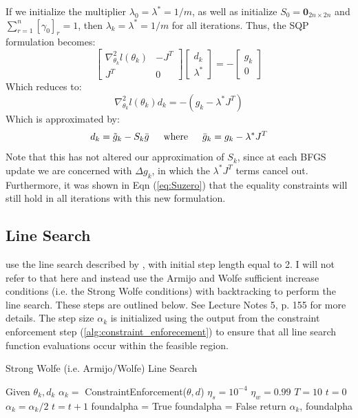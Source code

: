 \documentclass[letter,12pt]{article}
\begin{document}
If we initialize the multiplier $\lambda_0=\lambda^*=1/m$, as well as initialize $S_0 = \boldsymbol{0}_{2n \times 2n}$ and $\sum_{r=1}^{n}[\gamma_0]_r=1$, then $\lambda_k=\lambda^*=1/m$  for all iterations.  Thus, the SQP formulation becomes:  
\[
\left[
\begin{array}{cc}
\nabla^2_{\theta_k}l(\theta_k) & -J^T
\\
J^T & 0
\end{array}
\right]
\left[
\begin{array}{cc}
d_k
\\
\lambda^*
\end{array}
\right]
=
-
\left[
\begin{array}{c}
g_k
\\
0
\end{array}
\right]
\]
Which reduces to:
\[
\nabla^2_{\theta_k}l(\theta_k)d_k
=
-(g_k - \lambda^*J^T)
\]
Which is approximated by:
\[
d_k = \tilde{g}_k-S_k\bar{g}
\indent
\text{where}
\indent
\bar{g}_k = g_k-\lambda^*J^T
\]
Note that this has not altered our approximation of $S_k$, since at each BFGS update we are concerned with $\Delta g_k$, in which the $\lambda^*J^T$ terms cancel out.  Furthermore, it was shown in Eqn (\ref{eq:Suzero}) that the equality constraints will still hold in all iterations with this new formulation.

\subsection{Line Search}

\cite{jamshidianj97} use the line search described by \cite{jamshidianj93}, with initial step length equal to 2.  I will not refer to that here and instead use the Armijo and Wolfe sufficient increase conditions (i.e. the Strong Wolfe conditions) with backtracking to perform the line search.  These steps are outlined below.  See \cite{wrightlecturenotes} Lecture Notes 5, p. 155 for more details.  The step size $\alpha_k$ is initialized using the output from the constraint enforcement step (\ref{alg:constraint_enforecement}) to ensure that all line search function evaluations occur within the feasible region.


\begin{algorithm} [H]
\caption{Strong Wolfe (i.e. Armijo/Wolfe) Line Search}
\label{alg:armijo_wolfe}
\begin{algorithmic}[1]
\State Given $\theta_k, d_k$
\State $\alpha_k =$ ConstraintEnforcement($\theta,d$) 
\State $\eta_s = 10^{-4}$
\State $\eta_w = 0.99$
\State $T = 10$
\State $t = 0$
\State $\alpha_k = \alpha_k / 2$
\State $t = t + 1$
\EndWhile
{}
\State	foundalpha = True
\Else
\State  foundalpha = False
\EndIf
\State return $\alpha_k$, foundalpha
\end{algorithmic}
\end{algorithm}
\end{document}
